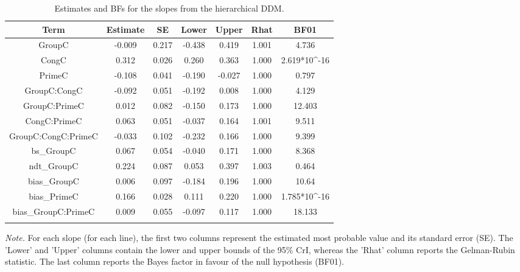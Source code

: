 \documentclass[
  11pt,
  english,
  ,doc,floatsintext]{apa6}
\begin{document}
\begin{table}[htb]

\begin{center}
\begin{threeparttable}

\caption{\label{tab:summary}Estimates and BFs for the slopes from the hierarchical DDM.}

\begin{tabular}{ccccccc}
\toprule
Term & \multicolumn{1}{c}{Estimate} & \multicolumn{1}{c}{SE} & \multicolumn{1}{c}{Lower} & \multicolumn{1}{c}{Upper} & \multicolumn{1}{c}{Rhat} & \multicolumn{1}{c}{BF01}\\
\midrule
GroupC & -0.009 & 0.217 & -0.438 & 0.419 & 1.001 & 4.736\\
CongC & 0.312 & 0.026 & 0.260 & 0.363 & 1.000 & 2.619*10\textasciicircum{}-16\\
PrimeC & -0.108 & 0.041 & -0.190 & -0.027 & 1.000 & 0.797\\
GroupC:CongC & -0.092 & 0.051 & -0.192 & 0.008 & 1.000 & 4.129\\
GroupC:PrimeC & 0.012 & 0.082 & -0.150 & 0.173 & 1.000 & 12.403\\
CongC:PrimeC & 0.063 & 0.051 & -0.037 & 0.164 & 1.001 & 9.511\\
GroupC:CongC:PrimeC & -0.033 & 0.102 & -0.232 & 0.166 & 1.000 & 9.399\\
bs\_GroupC & 0.067 & 0.054 & -0.040 & 0.171 & 1.000 & 8.368\\
ndt\_GroupC & 0.224 & 0.087 & 0.053 & 0.397 & 1.003 & 0.464\\
bias\_GroupC & 0.006 & 0.097 & -0.184 & 0.196 & 1.000 & 10.64\\
bias\_PrimeC & 0.166 & 0.028 & 0.111 & 0.220 & 1.000 & 1.785*10\textasciicircum{}-16\\
bias\_GroupC:PrimeC & 0.009 & 0.055 & -0.097 & 0.117 & 1.000 & 18.133\\
\bottomrule
\addlinespace
\end{tabular}

\begin{tablenotes}[para]
\normalsize{\textit{Note.} For each slope (for each line), the first two columns represent the estimated
    most probable value and its standard error (SE). The 'Lower' and 'Upper' columns
    contain the lower and upper bounds of the 95\% CrI, whereas the 'Rhat' column reports
    the Gelman-Rubin statistic. The last column reports the Bayes factor in favour of the
    null hypothesis (BF01).}
\end{tablenotes}

\end{threeparttable}
\end{center}

\end{table}
\end{document}
